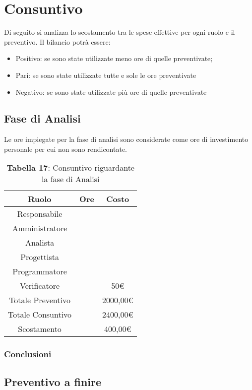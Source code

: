 \section{Consuntivo}
Di seguito si analizza lo scostamento tra le spese effettive per ogni ruolo e il preventivo. Il bilancio potrà essere:
\begin{itemize}
	\item Positivo: se sono state utilizzate meno ore di quelle preventivate;
	\item Pari: se sono state utilizzate tutte e sole le ore preventivate
	\item Negativo: se sono state utilizzate più ore di quelle preventivate
\end{itemize}
\subsection{Fase di Analisi}
Le ore impiegate per la fase di analisi sono considerate come ore di investimento personale per cui non sono rendicontate.
\begin{table}[H]
	\centering
	\renewcommand{\arraystretch}{1.5}
	\begin{tabular}{|c|c|c|}
		\hline
		\rowcolor{lighter-grayer}
		Ruolo & Ore & Costo \\
		\hline
		Responsabile &  &  \\
		\hline
		Amministratore &  &  \\
		\hline
		Analista &  &  \\
		\hline
		Progettista&  &  \\
		\hline
		Programmatore &  &  \\
		\hline
		Verificatore &  & 50\euro \\
		\hline
		Totale Preventivo &  &  2000,00\euro \\
		\hline
		Totale Consuntivo &  &  2400,00\euro \\
		\hline
		Scostamento &  &  400,00\euro \\
		\hline
	\end{tabular}
	\caption*{\textbf{Tabella 17}: Consuntivo riguardante la fase di Analisi\\}
\end{table}
\subsubsection{Conclusioni}
\subsection{Preventivo a finire}